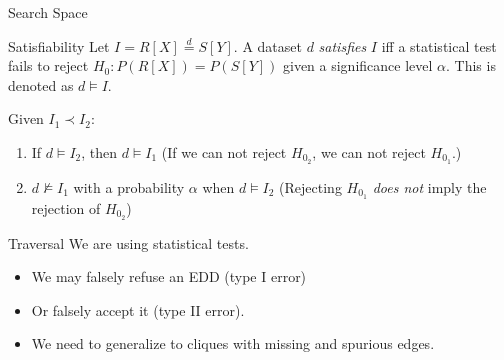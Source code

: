 \documentclass[10pt]{beamer}
\newcommand{\eqdist}{\stackrel{d}{=}}
\begin{document}
\begin{frame}{Search Space}
    \begin{alertblock}{Satisfiability}
    Let $I = R[X] \eqdist S[Y]$.
    A dataset $d$ \emph{satisfies} $I$ iff  a statistical test fails to reject $H_0: P(R[X]) = P(S[Y])$
    given a significance level $\alpha$.
    This is denoted as $d \models I$.

    \medskip
    
    Given $I_1 \prec I_2$:
    
    \begin{enumerate}
        \item If $d \models I_2$, then $d \models I_1$ (If we can not reject $H_{0_2}$, we can not reject $H_{0_1}$.)
        \item $d \not\models I_1$ with a probability $\alpha$ when $d \models I_2$
            (Rejecting $H_{0_1}$ \emph{does not} imply the rejection of $H_{0_2}$)
    \end{enumerate}
    
    \end{alertblock}


\end{frame}

\begin{frame}{Traversal}
    We are using statistical tests.
    
    \begin{itemize}
        \item We may falsely refuse an EDD (type I error)
        \item Or falsely accept it (type II error).
        \item We need to generalize to cliques with missing and spurious edges.
    \end{itemize}
\end{frame}
\end{document}
